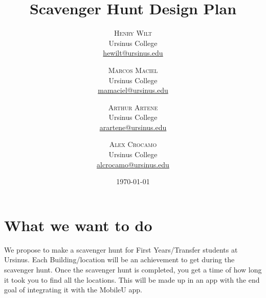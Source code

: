 \documentclass[twoside,twocolumn]{article}
\title{Scavenger Hunt Design Plan} %
\author{%
\textsc{Henry Wilt} \\[1ex]%
\normalsize Ursinus College \\ %
\normalsize \href{mailto:hewilt@ursinus.edu}{hewilt@ursinus.edu} %
\and %
\textsc{Marcos Maciel} \\[1ex] %
\normalsize Ursinus College \\ %
\normalsize \href{mailto:mamaciel@ursinus.edu}{mamaciel@ursinus.edu} %
\and %
\textsc{Arthur Artene} \\[1ex] %
\normalsize Ursinus College \\ %
\normalsize \href{mailto:arartene@ursinus.edu}{arartene@ursinus.edu} %
\and %
\textsc{Alex Crocamo} \\[1ex] %
\normalsize Ursinus College \\ %
\normalsize \href{mailto:alcrocamo@ursinus.edu}{alcrocamo@ursinus.edu} %
}
\date{\today} %
\begin{document}
\maketitle


\section{What we want to do}
\par We propose to make a scavenger hunt for First Years/Transfer students at Ursinus. Each Building/location will be an achievement to get during the scavenger hunt. Once the scavenger hunt is completed, you get a time of how long it took you to find all the locations. This will be made up in an app with the end goal of integrating it with the MobileU app.
\end{document}
